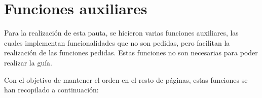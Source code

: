 \section*{Funciones auxiliares}

Para la realización de esta pauta, se hicieron varias funciones auxiliares, las cuales implementan funcionalidades que no son pedidas, pero facilitan la realización de las funciones pedidas. Estas funciones no son necesarias para poder realizar la guía. 

Con el objetivo de mantener el orden en el resto de páginas, estas funciones se han recopilado a continuación:


